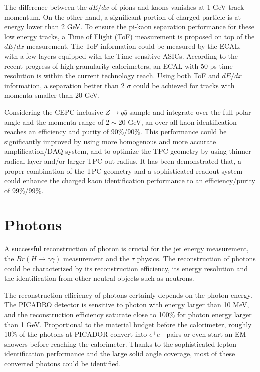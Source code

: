 The difference between the $dE/dx$ of pions and kaons vanishes at 1 GeV track momentum.
On the other hand, a significant portion of charged particle is at energy lower than 2 GeV.
To ensure the pi-kaon separation performance for these low energy tracks,
a Time of Flight (ToF) measurement is proposed on top of the $dE/dx$ measurement.
The ToF information could be measured by the ECAL, with a few layers equipped with the Time sensitive ASICs.
According to the recent progress of high granularity calorimeters,
an ECAL with 50 ps time resolution is within the current technology reach.
Using both ToF and $dE/dx$ information,
a separation better than 2 $\sigma$ could be achieved for tracks with momenta smaller than 20 GeV. 

Considering the CEPC inclusive $Z\to q\bar{q}$ sample and integrate over the full polar angle and the momenta range of $2\sim 20$ GeV,
an over all kaon identification reaches an efficiency and purity of 90\%/90\%.
This performance could be significantly improved by using more homogenous and more accurate amplification/DAQ system,
and to optimize the TPC geometry by using thinner radical layer and/or larger TPC out radius.
It has been demonstrated that,
a proper combination of the TPC geometry and a sophisticated readout system
could enhance the charged kaon identification performance to an efficiency/purity of 99\%/99\%.

\section{Photons}

A successful reconstruction of photon is crucial for the jet energy measurement,
the $Br(H \to \gamma \gamma)$ measurement and the $\tau$ physics.
The reconstruction of photons could be characterized by its reconstruction efficiency,
its energy resolution and the identification from other neutral objects such as neutrons.  

The reconstruction efficiency of photons certainly depends on the photon energy.
The PICADRO detector is sensitive to photon with energy larger than 10 MeV,
and the reconstruction efficiency saturate close to 100\% for photon energy larger than 1 GeV.
Proportional to the material budget before the calorimeter,
roughly 10\% of the photons at PICADOR convert into $e^+e^-$ pairs or even start an EM showers before reaching the calorimeter.
Thanks to the sophisticated lepton identification performance and the large solid angle coverage,
most of these converted photons could be identified. 
    
